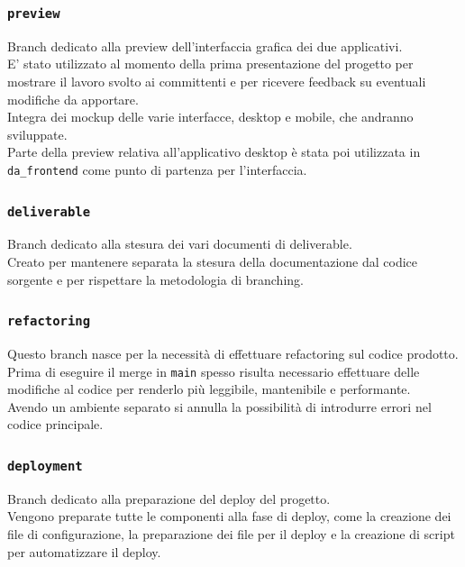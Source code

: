 \documentclass{article}
\begin{document}
\subsubsection{\texttt{preview}}

Branch dedicato alla preview dell'interfaccia grafica dei due applicativi.\\
E' stato utilizzato al momento della prima presentazione del progetto per mostrare il lavoro svolto ai committenti e per ricevere feedback su eventuali modifiche da apportare.\\
Integra dei mockup delle varie interfacce, desktop e mobile, che andranno sviluppate.\\
Parte della preview relativa all'applicativo desktop è stata poi utilizzata in \texttt{da\_frontend} come punto di partenza per l'interfaccia.

\subsubsection{\texttt{deliverable}}

Branch dedicato alla stesura dei vari documenti di deliverable.\\
Creato per mantenere separata la stesura della documentazione dal codice sorgente e per rispettare la metodologia di branching.

\subsubsection{\texttt{refactoring}}

Questo branch nasce per la necessità di effettuare refactoring sul codice prodotto. Prima di eseguire il merge in \texttt{main} spesso risulta necessario effettuare delle modifiche al codice per renderlo più leggibile, mantenibile e performante.\\
Avendo un ambiente separato si annulla la possibilità di introdurre errori nel codice principale.

\subsubsection{\texttt{deployment}}

Branch dedicato alla preparazione del deploy del progetto.\\
Vengono preparate tutte le componenti alla fase di deploy, come la creazione dei file di configurazione, la preparazione dei file per il deploy e la creazione di script per automatizzare il deploy.
\end{document}
